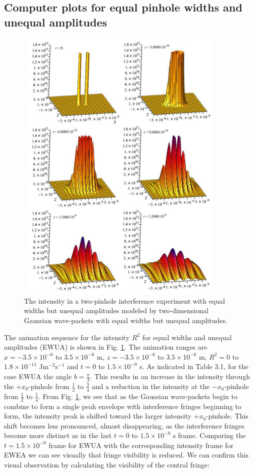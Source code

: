\documentclass[12pt]{article}       %
\begin{document}
\subsection{Computer plots for equal pinhole widths and unequal amplitudes}

\begin{figure}[h]
\unitlength=1in 
\hspace*{1.1in}\includegraphics[width=4in,height=5.33in]  {figure11.jpg} 
\caption{The intensity in a two-pinhole interference experiment with  equal widths but unequal amplitudes modeled by  two-dimensional Gaussian wave-packets with  equal widths but unequal amplitudes.\label{INT2DGUA}}
\end{figure}
The animation sequence for the intensity $R^2$ for equal widths and unequal amplitudes (EWUA) is shown in Fig. \ref{INT2DGUA}. The animation ranges are $x=-3.5\times 10^{-6}$ to $3.5\times 10^{-6}$ m, $z=-3.5\times 10^{-6}$ to $3.5\times 10^{-6}$ m, $R^2 = 0$ to $1.8\times 10^{-11}$ Jm$^{-2}$s$^{-1}$ and $t=0$ to $1.5\times 10^{-9}$ s. As indicated in Table 3.1, for the case  EWUA the angle  $b=\frac{\pi}{3}$. This results in an increase in the intensity through  the $+x_0$-pinhole from $\frac{1}{2}$ to $\frac{3}{4}$ and a reduction in the intensity at the $-x_0$-pinhole from $\frac{1}{2}$ to $\frac{1}{4}$. From Fig. \ref{INT2DGUA}, we see that as the Gaussian wave-packets begin to combine to form a single peak envelope with interference fringes beginning to form, the intensity peak is shifted toward the larger intensity $+x_0$-pinhole. This shift becomes less pronounced, almost disappearing,  as the  interference fringes become more distinct as in the last  $t=0$ to $1.5\times 10^{-9}$ s frame. Comparing the $t=1.5\times10^{-9}$ frame for EWUA with the corresponding intensity frame for EWEA we can see visually that fringe visibility is reduced. We can confirm this visual observation by calculating the visibility of the central fringe:
\end{document}
